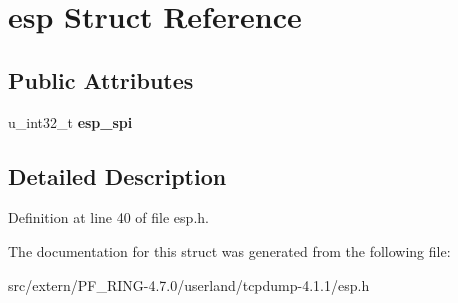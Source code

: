 \hypertarget{structesp}{
\section{esp Struct Reference}
\label{structesp}
}
\subsection*{Public Attributes}
\begin{DoxyCompactItemize}
\item 
\hypertarget{structesp_a6829abc113fa024e21883da139eb36b5}{
u\_\-int32\_\-t {\bfseries esp\_\-spi}}
\label{structesp_a6829abc113fa024e21883da139eb36b5}

\end{DoxyCompactItemize}


\subsection{Detailed Description}


Definition at line 40 of file esp.h.



The documentation for this struct was generated from the following file:\begin{DoxyCompactItemize}
\item 
src/extern/PF\_\-RING-\/4.7.0/userland/tcpdump-\/4.1.1/esp.h\end{DoxyCompactItemize}
